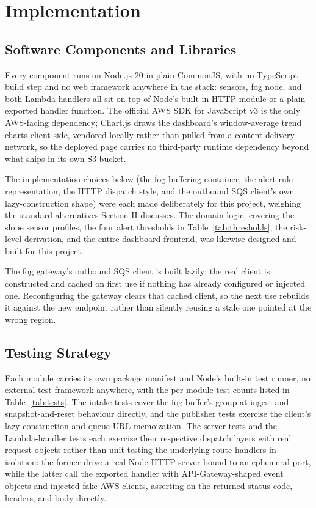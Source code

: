 \documentclass[conference]{IEEEtran}
\begin{document}
\section{Implementation}
\subsection{Software Components and Libraries}
Every component runs on Node.js 20 in plain CommonJS, with no TypeScript build step and no web framework anywhere in the stack: sensors, fog node, and both Lambda handlers all sit on top of Node's built-in HTTP module or a plain exported handler function. The official AWS SDK for JavaScript v3 is the only AWS-facing dependency; Chart.js draws the dashboard's window-average trend charts client-side, vendored locally rather than pulled from a content-delivery network, so the deployed page carries no third-party runtime dependency beyond what ships in its own S3 bucket.

The implementation choices below (the fog buffering container, the alert-rule representation, the HTTP dispatch style, and the outbound SQS client's own lazy-construction shape) were each made deliberately for this project, weighing the standard alternatives Section II discusses. The domain logic, covering the slope sensor profiles, the four alert thresholds in Table~\ref{tab:thresholds}, the risk-level derivation, and the entire dashboard frontend, was likewise designed and built for this project.

The fog gateway's outbound SQS client is built lazily: the real client is constructed and cached on first use if nothing has already configured or injected one. Reconfiguring the gateway clears that cached client, so the next use rebuilds it against the new endpoint rather than silently reusing a stale one pointed at the wrong region.

\subsection{Testing Strategy}
Each module carries its own package manifest and Node's built-in test runner, no external test framework anywhere, with the per-module test counts listed in Table~\ref{tab:tests}. The intake tests cover the fog buffer's group-at-ingest and snapshot-and-reset behaviour directly, and the publisher tests exercise the client's lazy construction and queue-URL memoization. The server tests and the Lambda-handler tests each exercise their respective dispatch layers with real request objects rather than unit-testing the underlying route handlers in isolation: the former drive a real Node HTTP server bound to an ephemeral port, while the latter call the exported handler with API-Gateway-shaped event objects and injected fake AWS clients, asserting on the returned status code, headers, and body directly.
\end{document}
